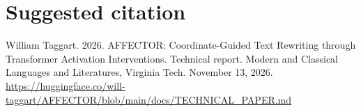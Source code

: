 \documentclass[manuscript,screen,nonacm]{acmart}
\begin{document}



\section*{Suggested citation}
William Taggart. 2026. AFFECTOR: Coordinate-Guided Text Rewriting
through Transformer Activation Interventions. Technical report. Modern
and Classical Languages and Literatures, Virginia Tech. November 13, 2026.
\url{https://huggingface.co/will-taggart/AFFECTOR/blob/main/docs/TECHNICAL_PAPER.md}
\end{document}

